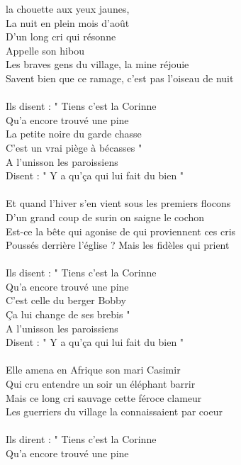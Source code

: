 %
 la chouette aux yeux jaunes,
\\La nuit en plein mois d'août
\\D'un long cri qui résonne
\\Appelle son hibou
\\Les braves gens du village, la mine réjouie
\\Savent bien que ce ramage, c'est pas l'oiseau de nuit
\\\\Ils disent : " Tiens c'est la Corinne
\\Qu'a encore trouvé une pine
\\La petite noire du garde chasse
\\C'est un vrai piège à bécasses "
\\A l'unisson les paroissiens
\\Disent : " Y a qu'ça qui lui fait du bien "
\\\\Et quand l'hiver s'en vient sous les premiers flocons
\\D'un grand coup de surin on saigne le cochon
\\Est-ce la bête qui agonise de qui proviennent ces cris
\\Poussés derrière l'église ? Mais les fidèles qui prient
\\\\Ils disent : " Tiens c'est la Corinne
\\Qu'a encore trouvé une pine
\\C'est celle du berger Bobby
\\Ça lui change de ses brebis "
\\A l'unisson les paroissiens
\\Disent : " Y a qu'ça qui lui fait du bien "
\\\\Elle amena en Afrique son mari Casimir
\\Qui cru entendre un soir un éléphant barrir
\\Mais ce long cri sauvage cette féroce clameur
\\Les guerriers du village la connaissaient par coeur
\\\\Ils dirent : " Tiens c'est la Corinne
\\Qu'a encore trouvé une pine
